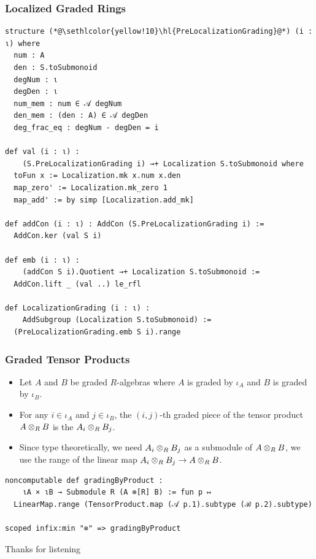 \documentclass[9pt]{beamer}
\begin{document}
\begin{frame}
  \frametitle{Localized Graded Rings}
\begin{lstlisting}[linebackgroundcolor={%
  \ifnum\value{lstnumber}=10\color{red!10}\fi
  \ifnum\value{lstnumber}=11\color{red!10}\fi
  \ifnum\value{lstnumber}=12\color{red!10}\fi
  \ifnum\value{lstnumber}=13\color{red!10}\fi
  \ifnum\value{lstnumber}=14\color{red!10}\fi
  % \ifnum\value{lstnumber}=15\color{red!10}\fi
  \ifnum\value{lstnumber}=16\color{green!10}\fi
  \ifnum\value{lstnumber}=17\color{green!10}\fi
  % \ifnum\value{lstnumber}=19\color{green!10}\fi
  \ifnum\value{lstnumber}=19\color{purple!15}\fi
  \ifnum\value{lstnumber}=20\color{purple!15}\fi
  \ifnum\value{lstnumber}=21\color{purple!15}\fi
  % \ifnum\value{lstnumber}=24\color{purple!15}\fi
  \ifnum\value{lstnumber}=23\color{olive!10}\fi
  \ifnum\value{lstnumber}=24\color{olive!10}\fi
  \ifnum\value{lstnumber}=25\color{olive!10}\fi
}, caption={Grading of localized rings}]
structure (*@\sethlcolor{yellow!10}\hl{PreLocalizationGrading}@*) (i : ι) where
  num : A
  den : S.toSubmonoid
  degNum : ι
  degDen : ι
  num_mem : num ∈ 𝒜 degNum
  den_mem : (den : A) ∈ 𝒜 degDen
  deg_frac_eq : degNum - degDen = i

def val (i : ι) : 
    (S.PreLocalizationGrading i) →+ Localization S.toSubmonoid where
  toFun x := Localization.mk x.num x.den
  map_zero' := Localization.mk_zero 1
  map_add' := by simp [Localization.add_mk]

def addCon (i : ι) : AddCon (S.PreLocalizationGrading i) := 
  AddCon.ker (val S i)

def emb (i : ι) : 
    (addCon S i).Quotient →+ Localization S.toSubmonoid :=
  AddCon.lift _ (val ..) le_rfl

def LocalizationGrading (i : ι) : 
    AddSubgroup (Localization S.toSubmonoid) := 
  (PreLocalizationGrading.emb S i).range
\end{lstlisting} 
\end{frame}

\begin{frame}[fragile]
  \frametitle{Graded Tensor Products}
\begin{itemize}
  \item 
  Let $A$ and $B$ be graded $R$-algebras where $A$ is graded by $\iota_{A}$ and $B$ is graded by $\iota_B$.
  \item 
  For any $i \in \iota_A$ and $j \in \iota_B$, the $(i,j)$-th graded piece of the tensor product $A \otimes_R B$ is the 
  $A_i \otimes_R B_j$. 
  \item 
  Since type theoretically, we need $A_i \otimes_R B_j$ as a submodule of $A \otimes_R B$, we use the range 
  of the linear map $A_i \otimes_R B_j \to A \otimes_R B$.
\end{itemize}
  \begin{lstlisting}[caption={Graded Tensor Product}]
noncomputable def gradingByProduct : 
    ιA × ιB → Submodule R (A ⊗[R] B) := fun p ↦ 
  LinearMap.range (TensorProduct.map (𝒜 p.1).subtype (ℬ p.2).subtype)

scoped infix:min "⊗" => gradingByProduct
  \end{lstlisting}
\end{frame}

\begin{frame}
\begin{center}
Thanks for listening
\end{center}
\end{frame}
\end{document}
